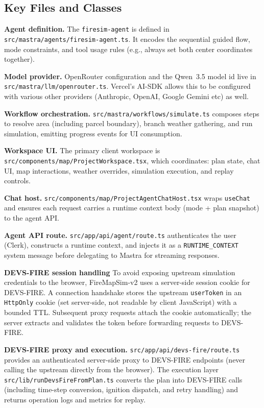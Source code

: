 \documentclass[12pt]{article}
\begin{document}
\subsection{Key Files and Classes}

\textbf{Agent definition.}
The \texttt{firesim-agent} is defined in
\texttt{src/mastra/agents/firesim-agent.ts}. It encodes the sequential guided flow, mode
constraints, and tool usage rules (e.g., always set both center coordinates together).

\textbf{Model provider.}
OpenRouter configuration and the Qwen~3.5 model id live in \\
\texttt{src/mastra/llm/openrouter.ts}. Vercel's AI-SDK allows this to be configured with various other providers (Anthropic, OpenAI, Google Gemini etc) as well.

\textbf{Workflow orchestration.}
\texttt{src/mastra/workflows/simulate.ts} composes steps to resolve area (including parcel
boundary), branch weather gathering, and run simulation, emitting progress events for UI
consumption.

\textbf{Workspace UI.}
The primary client workspace is \texttt{src/components/map/ProjectWorkspace.tsx}, which
coordinates: plan state, chat UI, map interactions, weather overrides, simulation execution, and
replay controls.

\textbf{Chat host.}
\texttt{src/components/map/ProjectAgentChatHost.tsx} wraps \texttt{useChat} and ensures each
request carries a runtime context body (mode + plan snapshot) to the agent API.

\textbf{Agent API route.}
\texttt{src/app/api/agent/route.ts} authenticates the user (Clerk), constructs a runtime context,
and injects it as a \texttt{RUNTIME\_CONTEXT} system message before delegating to Mastra for
streaming responses.

\textbf{DEVS-FIRE session handling}
To avoid exposing upstream simulation credentials to the browser, FireMapSim-v2 uses a server-side
session cookie for DEVS-FIRE. A connection handshake stores the upstream \texttt{userToken} in an
\texttt{HttpOnly} cookie (set server-side, not readable by client JavaScript) with a bounded TTL.
Subsequent proxy requests attach the cookie automatically; the server extracts and validates the
token before forwarding requests to DEVS-FIRE.

\textbf{DEVS-FIRE proxy and execution.}
\texttt{src/app/api/devs-fire/route.ts} provides an authenticated server-side proxy to DEVS-FIRE
endpoints (never calling the upstream directly from the browser). The execution layer
\texttt{src/lib/runDevsFireFromPlan.ts} converts the plan into DEVS-FIRE calls (including
time-step conversion, ignition dispatch, and retry handling) and returns operation logs and
metrics for replay.
\end{document}
